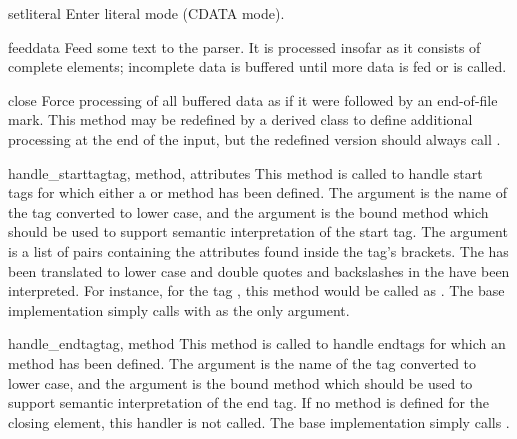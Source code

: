 \begin{funcdesc}{setliteral}{}
Enter literal mode (CDATA mode).
\end{funcdesc}

\begin{funcdesc}{feed}{data}
Feed some text to the parser.  It is processed insofar as it consists
of complete elements; incomplete data is buffered until more data is
fed or  is called.
\end{funcdesc}

\begin{funcdesc}{close}{}
Force processing of all buffered data as if it were followed by an
end-of-file mark.  This method may be redefined by a derived class to
define additional processing at the end of the input, but the
redefined version should always call .
\end{funcdesc}

\begin{funcdesc}{handle_starttag}{tag, method, attributes}
This method is called to handle start tags for which either a
 or  method has been
defined.  The  argument is the name of the tag converted to
lower case, and the  argument is the bound method which
should be used to support semantic interpretation of the start tag.
The  argument is a list of 
pairs containing the attributes found inside the tag's \code{<>}
brackets.  The  has been translated to lower case and double
quotes and backslashes in the  have been interpreted.  For
instance, for the tag , this
method would be called as .  The base implementation simply calls
 with  as the only argument.
\end{funcdesc}

\begin{funcdesc}{handle_endtag}{tag, method}
This method is called to handle endtags for which an
 method has been defined.  The 
argument is the name of the tag converted to lower case, and the
 argument is the bound method which should be used to
support semantic interpretation of the end tag.  If no
 method is defined for the closing element,
this handler is not called.  The base implementation simply calls
.
\end{funcdesc}


